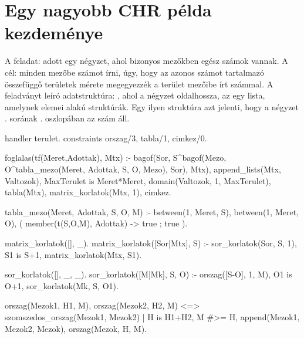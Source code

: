 \section{Egy nagyobb CHR példa kezdeménye}

A feladat: adott egy négyzet, ahol bizonyos mezőkben egész számok vannak.
A cél: minden mezőbe számot írni, úgy, hogy az azonos számot tartalmazó
összefüggő területek mérete megegyezzék a terület mezőibe írt számmal. 
\br
A feladványt leíró adatstruktúra: , ahol 
a négyzet oldalhossza, az  egy lista, amelynek elemei 
 alakú struktúrák. Egy ilyen struktúra azt jelenti, hogy a
négyzet . sorának . oszlopában az  szám áll.

\begin{prologcode}
handler terulet.
constraints orszag/3, tabla/1, cimkez/0.




foglalas(tf(Meret,Adottak), Mtx) :-
    bagof(Sor,
          S^bagof(Mezo, 
                  O^tabla_mezo(Meret, Adottak, S, O, Mezo), 
                  Sor),
          Mtx),
    append_lists(Mtx, Valtozok),         %
    MaxTerulet is Meret*Meret,
    domain(Valtozok, 1, MaxTerulet),
    tabla(Mtx),                          %
    matrix_korlatok(Mtx, 1),             %
    cimkez.                              %

tabla_mezo(Meret, Adottak, S, O, M) :-
    between(1, Meret, S),               %
    between(1, Meret, O),
    (   member(t(S,O,M), Adottak) -> true
    ;   true
    ).

matrix_korlatok([], _).
matrix_korlatok([Sor|Mtx], S) :-
    sor_korlatok(Sor, S, 1),
    S1 is S+1,
    matrix_korlatok(Mtx, S1).

sor_korlatok([], _, _).
sor_korlatok([M|Mk], S, O) :-
    orszag([S-O], 1, M),
    O1 is O+1,
    sor_korlatok(Mk, S, O1).



orszag(Mezok1, H1, M), orszag(Mezok2, H2, M) <=>
                szomszedos_orszag(Mezok1, Mezok2) |
                H is H1+H2,
                M #>= H,
                append(Mezok1, Mezok2, Mezok),
                orszag(Mezok, H, M).


\end{prologcode}
